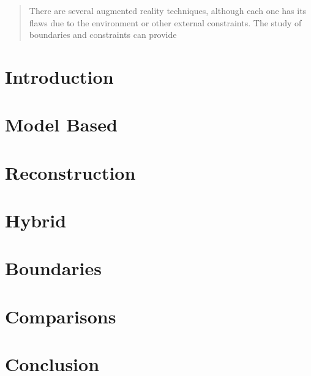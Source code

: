 \documentclass[]{article}
\title{}
\author{Bruno Duarte Corrêa}
\begin{document}
\maketitle

\begin{abstract}

There are several augmented reality techniques, although each one has its flaws due to the environment or other external constraints. The study of boundaries and constraints can provide 


\end{abstract}



\section{Introduction}


\section{Model Based}



\section{Reconstruction}


\section{Hybrid}



\section{Boundaries}


\section{Comparisons}



\section{Conclusion}




\end{document}
